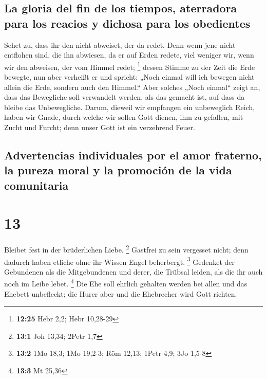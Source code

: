 \hypertarget{la-gloria-del-fin-de-los-tiempos-aterradora-para-los-reacios-y-dichosa-para-los-obedientes}{%
\subsection{La gloria del fin de los tiempos, aterradora para los
reacios y dichosa para los
obedientes}\label{la-gloria-del-fin-de-los-tiempos-aterradora-para-los-reacios-y-dichosa-para-los-obedientes}}

 Sehet zu, dass ihr den nicht abweiset, der da redet.
Denn wenn jene nicht entflohen sind, die ihn abwiesen, da er auf Erden
redete, viel weniger wir, wenn wir den abweisen, der vom Himmel redet;
\footnote{\textbf{12:25} Hebr 2,2; Hebr 10,28-29}  dessen
Stimme zu der Zeit die Erde bewegte, nun aber verheißt er und spricht:
„Noch einmal will ich bewegen nicht allein die Erde, sondern auch den
Himmel.``  Aber solches „Noch einmal`` zeigt an, dass das
Bewegliche soll verwandelt werden, als das gemacht ist, auf dass da
bleibe das Unbewegliche.  Darum, dieweil wir empfangen
ein unbeweglich Reich, haben wir Gnade, durch welche wir sollen Gott
dienen, ihm zu gefallen, mit Zucht und Furcht;  denn
unser Gott ist ein verzehrend Feuer.

\hypertarget{advertencias-individuales-por-el-amor-fraterno-la-pureza-moral-y-la-promociuxf3n-de-la-vida-comunitaria}{%
\subsection{Advertencias individuales por el amor fraterno, la pureza
moral y la promoción de la vida
comunitaria}\label{advertencias-individuales-por-el-amor-fraterno-la-pureza-moral-y-la-promociuxf3n-de-la-vida-comunitaria}}

\hypertarget{section-12}{%
\section{13}\label{section-12}}

 Bleibet fest in der brüderlichen Liebe. \footnote{\textbf{13:1}
  Joh 13,34; 2Petr 1,7}  Gastfrei zu sein vergesset nicht;
denn dadurch haben etliche ohne ihr Wissen Engel beherbergt. \footnote{\textbf{13:2}
  1Mo 18,3; 1Mo 19,2-3; Röm 12,13; 1Petr 4,9; 3Jo 1,5-8} 
Gedenket der Gebundenen als die Mitgebundenen und derer, die Trübsal
leiden, als die ihr auch noch im Leibe lebet. \footnote{\textbf{13:3} Mt
  25,36}  Die Ehe soll ehrlich gehalten werden bei allen
und das Ehebett unbefleckt; die Hurer aber und die Ehebrecher wird Gott
richten.

